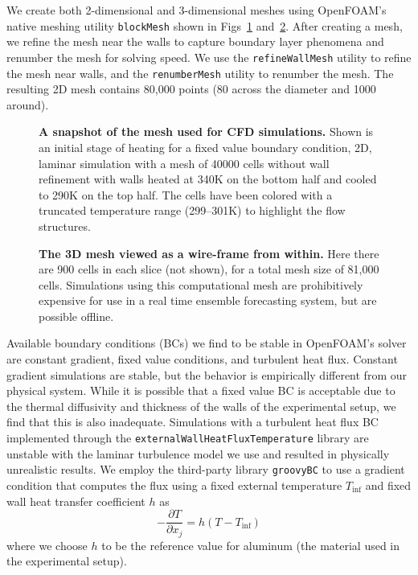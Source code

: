 \documentclass[10pt,letterpaper]{article}
\newcommand{\partialdiff}[2]{\frac{\partial #1}{\partial #2}}
\begin{document}
We create both 2-dimensional and 3-dimensional meshes using OpenFOAM's native meshing utility \verb|blockMesh| shown in Figs~\ref{fig:CFDmesh1} and~\ref{fig:CFDmesh2}.
After creating a mesh, we refine the mesh near the walls to capture boundary layer phenomena and renumber the mesh for solving speed.
We use the \verb|refineWallMesh| utility to refine the mesh near walls, and the \verb|renumberMesh| utility to renumber the mesh.
The resulting 2D mesh contains 80,000 points (80 across the diameter and 1000 around).

\begin{figure}[h]
  \centering
  \caption[A snapshot of the mesh used for CFD simulations]{
\textbf{    A snapshot of the mesh used for CFD simulations.
}    Shown is an initial stage of heating for a fixed value boundary condition, 2D, laminar simulation with a mesh of 40000 cells without wall refinement with walls heated at 340K on the bottom half and cooled to 290K on the top half.
    The cells have been colored with a truncated temperature range (299--301K) to highlight the flow structures.
  }
  \label{fig:CFDmesh1}
\end{figure}

\begin{figure}[h]
  \centering
  \caption[The 3D mesh viewed as a wire-frame from within]{
\textbf{    The 3D mesh viewed as a wire-frame from within.
}    Here there are 900 cells in each slice (not shown), for a total mesh size of 81,000 cells.
    Simulations using this computational mesh are prohibitively expensive for use in a real time ensemble forecasting system, but are possible offline.
  }
  \label{fig:CFDmesh2}
\end{figure}

Available boundary conditions (BCs) we find to be stable in OpenFOAM's solver are constant gradient, fixed value conditions, and turbulent heat flux.
Constant gradient simulations are stable, but the behavior is empirically different from our physical system.
While it is possible that a fixed value BC is acceptable due to the thermal diffusivity and thickness of the walls of the experimental setup, we find that this is also inadequate.
Simulations with a turbulent heat flux BC implemented through the \verb|externalWallHeatFluxTemperature| library are unstable with the laminar turbulence model we use and resulted in physically unrealistic results.
We employ the third-party library \verb|groovyBC| to use a gradient condition that computes the flux using a fixed external temperature $T_\text{inf}$ and fixed wall heat transfer coefficient $h$ as $$ - \partialdiff{T}{x_j} = h \left( T-T_\text{inf} \right)$$ where we choose $h$ to be the reference value for aluminum (the material used in the experimental setup).
\end{document}
